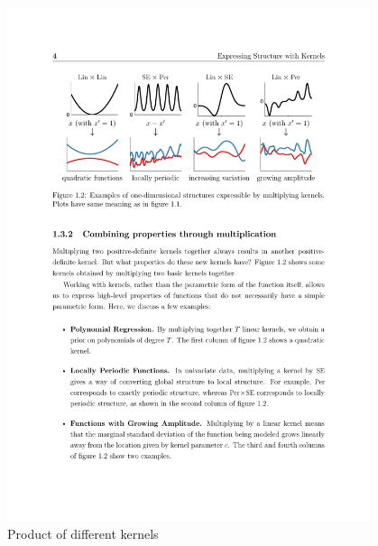 \begin{figure}[h]
\center
	\includegraphics[width=0.95\textwidth]{figures/kernel2}
	\caption{Product of different kernels \label{fig:ker2}}
\end{figure}

